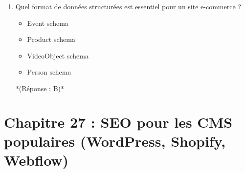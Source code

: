 \documentclass[12pt,a4paper,twoside]{report}
\begin{document}
\begin{enumerate}
    \item Quel format de données structurées est essentiel pour un site e-commerce ?
    \begin{itemize}
        \item[A)] Event schema
        \item[B)] Product schema
        \item[C)] VideoObject schema
        \item[D)] Person schema
    \end{itemize}
    *(Réponse : B)*
\end{enumerate}

\section*{Chapitre 27 : SEO pour les CMS populaires (WordPress, Shopify, Webflow)}
\end{document}
